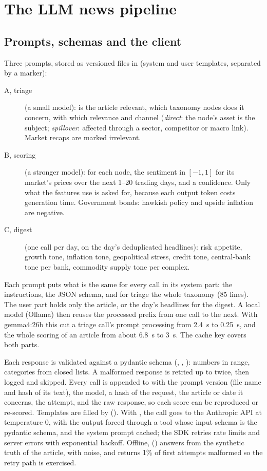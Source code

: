 \chapter{The LLM news pipeline}\label{ch:rb-news}

\section{Prompts, schemas and the client}
Three prompts, stored as versioned files in  (system and user templates, separated by a marker):
\begin{description}
  \item[A, triage] (a small model): is the article relevant, which taxonomy nodes does it concern, with which
        relevance and channel (\emph{direct}: the node's asset is the subject; \emph{spillover}: affected through
        a sector, competitor or macro link). Market recaps are marked irrelevant.
  \item[B, scoring] (a stronger model): for each node, the sentiment in $[-1,1]$ for its market's prices over the
        next 1--20 trading days, and a confidence. Only what the features use is asked for, because each output
        token costs generation time. Government bonds: hawkish policy and upside inflation are negative.
  \item[C, digest] (one call per day, on the day's deduplicated headlines): risk appetite, growth tone, inflation
        tone, geopolitical stress, credit tone, central-bank tone per bank, commodity supply tone per complex.
\end{description}
Each prompt puts what is the same for every call in its system part: the instructions, the JSON schema, and for
triage the whole taxonomy (85 lines). The user part holds only the article, or the day's headlines for the digest.
A local model (Ollama) then reuses the processed prefix from one call to the next. With gemma4:26b this cut a triage
call's prompt processing from 2.4~s to 0.25~s, and the whole scoring of an article from about 6.8~s to 3~s. The
cache key covers both parts.

Each response is validated against a pydantic schema (, ,
): numbers in range, categories from closed lists. A malformed response is retried up to
twice, then logged and skipped. Every call is appended to  with the prompt version (file
name and hash of its text), the model, a hash of the request, the article or date it concerns, the attempt, and
the raw response, so each score can be reproduced or re-scored. Templates are filled by 
().
With , the call goes to the Anthropic API at temperature 0, with the output forced through a tool whose
input schema is the pydantic schema, and the system prompt cached; the SDK retries rate limits and server errors
with exponential backoff. Offline,  () answers from the synthetic truth of
the article, with noise, and returns 1\% of first attempts malformed so the retry path is exercised.
